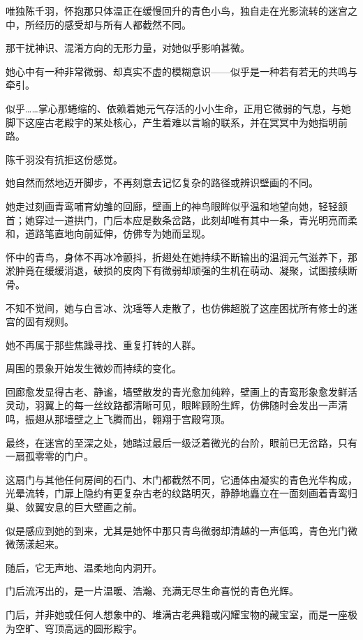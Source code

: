 \vspace{2em}

唯独陈千羽，怀抱那只体温正在缓慢回升的青色小鸟，独自走在光影流转的迷宫之中，所经历的感受却与所有人都截然不同。

那干扰神识、混淆方向的无形力量，对她似乎影响甚微。

她心中有一种非常微弱、却真实不虚的模糊意识——似乎是一种若有若无的共鸣与牵引。

似乎……掌心那蜷缩的、依赖着她元气存活的小小生命，正用它微弱的气息，与她脚下这座古老殿宇的某处核心，产生着难以言喻的联系，并在冥冥中为她指明前路。

陈千羽没有抗拒这份感觉。

她自然而然地迈开脚步，不再刻意去记忆复杂的路径或辨识壁画的不同。

她走过刻画青鸾哺育幼雏的回廊，壁画上的神鸟眼眸似乎温和地望向她，轻轻颔首；她穿过一道拱门，门后本应是数条岔路，此刻却唯有其中一条，青光明亮而柔和，道路笔直地向前延伸，仿佛专为她而呈现。

怀中的青鸟，身体不再冰冷颤抖，折翅处在她持续不断输出的温润元气滋养下，那淤肿竟在缓缓消退，破损的皮肉下有微弱却顽强的生机在萌动、凝聚，试图接续断骨。

不知不觉间，她与白言冰、沈瑶等人走散了，也仿佛超脱了这座困扰所有修士的迷宫的固有规则。

她不再属于那些焦躁寻找、重复打转的人群。

\vspace{2em}

周围的景象开始发生微妙而持续的变化。

回廊愈发显得古老、静谧，墙壁散发的青光愈加纯粹，壁画上的青鸾形象愈发鲜活灵动，羽翼上的每一丝纹路都清晰可见，眼眸顾盼生辉，仿佛随时会发出一声清鸣，振翅从那墙壁之上飞腾而出，翱翔于宫殿穹顶。

最终，在迷宫的至深之处，她踏过最后一级泛着微光的台阶，眼前已无岔路，只有一扇孤零零的门户。

这扇门与其他任何房间的石门、木门都截然不同，它通体由凝实的青色光华构成，光晕流转，门扉上隐约有更复杂古老的纹路明灭，静静地矗立在一面刻画着青鸾归巢、敛翼安息的巨大壁画之前。

似是感应到她的到来，尤其是她怀中那只青鸟微弱却清越的一声低鸣，青色光门微微荡漾起来。

随后，它无声地、温柔地向内洞开。

门后流泻出的，是一片温暖、浩瀚、充满无尽生命喜悦的青色光辉。

\vspace{2em}

门后，并非她或任何人想象中的、堆满古老典籍或闪耀宝物的藏宝室，而是一座极为空旷、穹顶高远的圆形殿宇。

